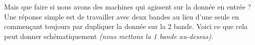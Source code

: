 Mais que faire si nous avons des machines qui agissent sur la donnée en entrée ?
Une réponse simple est de travailler avec deux bandes au lieu d'une seule en commençant toujours par dupliquer la donnée sur la 2\ieme{} bande.
Voici ce que cela peut donner schématiquement \emph{(nous mettons la 1\iere{} bande au-dessus)}.

\begin{multicols}{2}


\phantom{\emptybox\emptybox}%
	\deah

\emptybox\emptybox%
\emptybox\emptybox

\emptybox\emptybox%
	\emptybox\emptybox\emptybox%
\emptybox\emptybox

\phantom{\emptybox\emptybox}%
	\head


\medskip %

\phantom{\emptybox\emptybox\emptybox}%
	\deah

\emptybox\emptybox%
\emptybox\emptybox

\emptybox\emptybox%
	\emptybox\emptybox%
\emptybox\emptybox

\phantom{\emptybox\emptybox\emptybox}%
	\head


\medskip %

\phantom{\emptybox\emptybox\emptybox\emptybox}%
	\deah

\emptybox\emptybox%
\emptybox\emptybox

\emptybox\emptybox%
	\emptybox%
\emptybox\emptybox

\phantom{\emptybox\emptybox\emptybox\emptybox}%
	\head


\medskip %

\phantom{\emptybox\emptybox\emptybox\emptybox\emptybox}%
	\deah

\emptybox\emptybox%
\emptybox\emptybox

\emptybox\emptybox%
\emptybox\emptybox

\phantom{\emptybox\emptybox\emptybox\emptybox\emptybox}%
	\head

\end{multicols}


